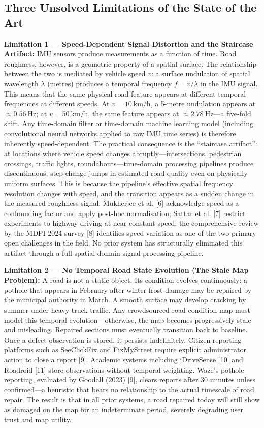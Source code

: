 \documentclass[conference]{IEEEtran}
\begin{document}
\subsection{Three Unsolved Limitations of the State of the Art}

\textbf{Limitation 1 --- Speed-Dependent Signal Distortion and the Staircase Artifact:} IMU sensors produce measurements as a function of time.
Road roughness, however, is a geometric property of a spatial surface.
The relationship between the two is mediated by vehicle speed $v$: a surface undulation of spatial wavelength $\lambda$ (metres) produces a temporal frequency $f = v / \lambda$ in the IMU signal.
This means that the same physical road feature appears at different temporal frequencies at different speeds.
At $v = 10~\text{km/h}$, a 5-metre undulation appears at $\approx 0.56~\text{Hz}$;
at $v = 50~\text{km/h}$, the same feature appears at $\approx 2.78~\text{Hz}$---a five-fold shift.
Any time-domain filter or time-domain machine learning model (including convolutional neural networks applied to raw IMU time series) is therefore inherently speed-dependent.
The practical consequence is the ``staircase artifact'': at locations where vehicle speed changes abruptly---intersections, pedestrian crossings, traffic lights, roundabouts---time-domain processing pipelines produce discontinuous, step-change jumps in estimated road quality even on physically uniform surfaces.
This is because the pipeline's effective spatial frequency resolution changes with speed, and the transition appears as a sudden change in the measured roughness signal.
Mukherjee et al. [6] acknowledge speed as a confounding factor and apply post-hoc normalisation; Sattar et al.
[7] restrict experiments to highway driving at near-constant speed; the comprehensive review by the MDPI 2024 survey [8] identifies speed variation as one of the two primary open challenges in the field.
No prior system has structurally eliminated this artifact through a full spatial-domain signal processing pipeline.

\textbf{Limitation 2 --- No Temporal Road State Evolution (The Stale Map Problem):} A road is not a static object.
Its condition evolves continuously: a pothole that appears in February after winter frost-damage may be repaired by the municipal authority in March.
A smooth surface may develop cracking by summer under heavy truck traffic.
Any crowdsourced road condition map must model this temporal evolution---otherwise, the map becomes progressively stale and misleading.
Repaired sections must eventually transition back to baseline.
Once a defect observation is stored, it persists indefinitely. Citizen reporting platforms such as SeeClickFix and FixMyStreet require explicit administrator action to close a report [9].
Academic systems including iDriveSense [10] and Roadroid [11] store observations without temporal weighting.
Waze's pothole reporting, evaluated by Goodall (2023) [9], clears reports after 30 minutes unless confirmed---a heuristic that bears no relationship to the actual timescale of road repair.
The result is that in all prior systems, a road repaired today will still show as damaged on the map for an indeterminate period, severely degrading user trust and map utility.
\end{document}
